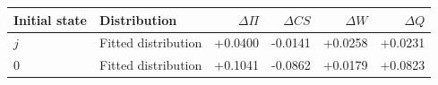 \begin{tabular}{llrrrr}\toprule
Initial state & Distribution & $\Delta\Pi$ & $\Delta CS$ & $\Delta W$ & $\Delta Q$\\\midrule
$j$ & Fitted distribution & +0.0400 & -0.0141 & +0.0258 & +0.0231 \\
$0$ & Fitted distribution & +0.1041 & -0.0862 & +0.0179 & +0.0823 \\
\bottomrule\end{tabular}
